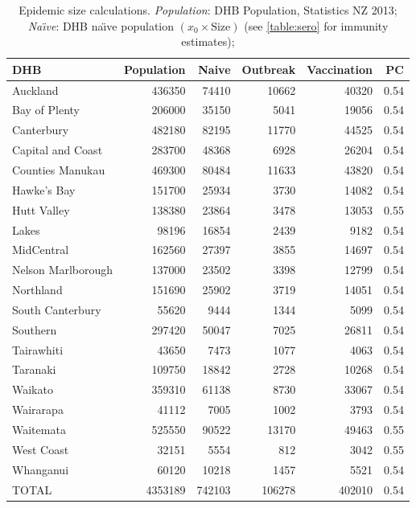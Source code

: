 \documentclass{article}
\begin{document}
\begin{table}
\small
\begin{tabular}{lrrrrr}
  \hline
DHB & Population & Naive & Outbreak & Vaccination & PC \\ 
  \hline
Auckland & 436350 & 74410 & 10662 & 40320 & 0.54 \\ 
  Bay of Plenty & 206000 & 35150 & 5041 & 19056 & 0.54 \\ 
  Canterbury & 482180 & 82195 & 11770 & 44525 & 0.54 \\ 
  Capital and Coast & 283700 & 48368 & 6928 & 26204 & 0.54 \\ 
  Counties Manukau & 469300 & 80484 & 11633 & 43820 & 0.54 \\ 
  Hawke's Bay & 151700 & 25934 & 3730 & 14082 & 0.54 \\ 
  Hutt Valley & 138380 & 23864 & 3478 & 13053 & 0.55 \\ 
  Lakes & 98196 & 16854 & 2439 & 9182 & 0.54 \\ 
  MidCentral & 162560 & 27397 & 3855 & 14697 & 0.54 \\ 
  Nelson Marlborough & 137000 & 23502 & 3398 & 12799 & 0.54 \\ 
  Northland & 151690 & 25902 & 3719 & 14051 & 0.54 \\ 
  South Canterbury & 55620 & 9444 & 1344 & 5099 & 0.54 \\ 
  Southern & 297420 & 50047 & 7025 & 26811 & 0.54 \\ 
  Tairawhiti & 43650 & 7473 & 1077 & 4063 & 0.54 \\ 
  Taranaki & 109750 & 18842 & 2728 & 10268 & 0.54 \\ 
  Waikato & 359310 & 61138 & 8730 & 33067 & 0.54 \\ 
  Wairarapa & 41112 & 7005 & 1002 & 3793 & 0.54 \\ 
  Waitemata & 525550 & 90522 & 13170 & 49463 & 0.55 \\ 
  West Coast & 32151 & 5554 & 812 & 3042 & 0.55 \\ 
  Whanganui & 60120 & 10218 & 1457 & 5521 & 0.54 \\ 
  TOTAL & 4353189 & 742103 & 106278 & 402010 & 0.54 \\ 
   \hline
\end{tabular}\caption{Epidemic size calculations. \textit{Population}: DHB Population, Statistics NZ 2013;  	
\textit{Na\"{\i}ve}: DHB na\"{\i}ve population $\left(x_0\times\text{Size}\right)$ (see \autoref{table:sero} for immunity estimates);
}
\end{table}
\end{document}
